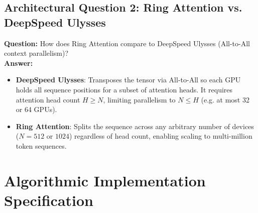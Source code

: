 \documentclass[11pt,a4paper]{article}
\theoremstyle{definition}
\begin{document}
\subsection{Architectural Question 2: Ring Attention vs. DeepSpeed Ulysses}
\textbf{Question:} How does Ring Attention compare to DeepSpeed Ulysses (All-to-All context parallelism)?\\
\textbf{Answer:} 
\begin{itemize}
    \item \textbf{DeepSpeed Ulysses}: Transposes the tensor via All-to-All so each GPU holds all sequence positions for a subset of attention heads. It requires attention head count $H \ge N$, limiting parallelism to $N \le H$ (e.g. at most 32 or 64 GPUs).
    \item \textbf{Ring Attention}: Splits the sequence across any arbitrary number of devices ($N = 512$ or $1024$) regardless of head count, enabling scaling to multi-million token sequences.
\end{itemize}

\section{Algorithmic Implementation Specification}
\end{document}
